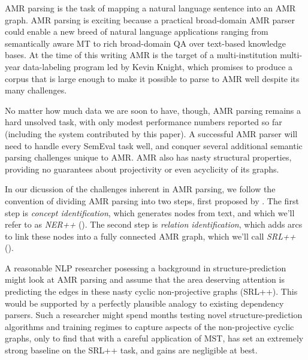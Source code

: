 \documentclass[11pt]{article}
\begin{document}
AMR parsing is the task of mapping a natural language sentence into an AMR graph.
AMR parsing is exciting because a practical broad-domain AMR parser could enable a new breed of natural language applications ranging from semantically aware MT to rich broad-domain QA over text-based knowledge bases.
At the time of this writing AMR is the target of a multi-institution multi-year data-labeling program led by Kevin Knight, which promises to produce a corpus that is large enough to make it possible to parse to AMR well despite its many challenges.


No matter how much data we are soon to have, though, AMR parsing remains a hard unsolved task, with only modest performance numbers reported so far (including the system contributed by this paper).
A successful AMR parser will need to handle every SemEval task well, and conquer several additional semantic parsing challenges unique to AMR.
AMR also has nasty structural properties, providing no guarantees about projectivity or even acyclicity of its graphs.

In our dicussion of the challenges inherent in AMR parsing, we follow the convention of dividing AMR parsing into two steps, first proposed by \cite{Flanigan:14}. 
The first step is \textit{concept identification}, which generates nodes from text, and which we'll refer to as \textit{NER++} (). 
The second step is \textit{relation identification}, which adds arcs to link these nodes into a fully connected AMR graph, which we'll call \textit{SRL++} ().

A reasonable NLP researcher posessing a background in structure-prediction might look at AMR parsing and assume that the area deserving attention is predicting the edges in these nasty cyclic non-projective graphs (SRL++).
This would be supported by a perfectly plausible analogy to existing dependency parsers.
Such a researcher might spend months testing novel structure-prediction algorithms and training regimes to capture aspects of the non-projective cyclic graphs, only to find that with a careful application of MST, \cite{Flanigan:14} has set an extremely strong baseline on the SRL++ task, and gains are negligible at best.
\end{document}
